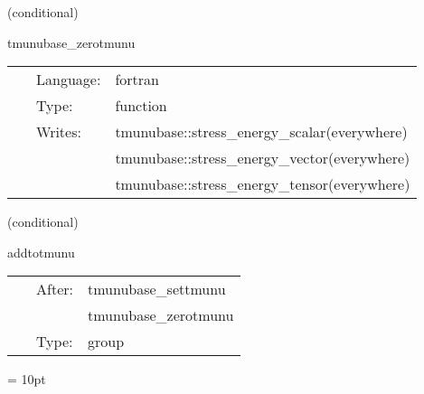\documentclass{article}
\begin{document}
   (conditional) 

\hspace{5mm} tmunubase\_zerotmunu 

\hspace{5mm}{\it initialise the stress-energy tensor to zero } 


\hspace{5mm}

 \begin{tabular*}{160mm}{cll} 
~ & Language:  & fortran \\ 
~ & Type:  & function \\ 
~ & Writes:  & tmunubase::stress\_energy\_scalar(everywhere) \\ 
~& ~ &tmunubase::stress\_energy\_vector(everywhere)\\ 
~& ~ &tmunubase::stress\_energy\_tensor(everywhere)\\ 
\end{tabular*} 


\vspace{5mm}

   (conditional) 

\hspace{5mm} addtotmunu 

\hspace{5mm}{\it add to the stress-energy tensor here } 


\hspace{5mm}

 \begin{tabular*}{160mm}{cll} 
~ & After:  & tmunubase\_settmunu \\ 
~& ~ &tmunubase\_zerotmunu\\ 
~ & Type:  & group \\ 
\end{tabular*} 



\vspace{5mm}\parskip = 10pt 
\end{document}
